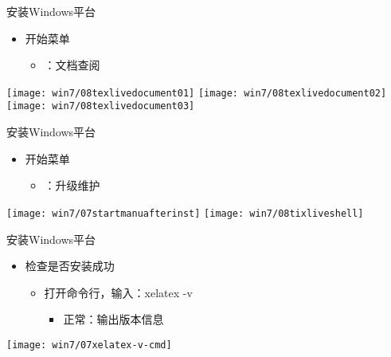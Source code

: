 \documentclass[fontset = none, t]{ctexbeamer}
\begin{document}
\begin{frame}{安装\tl}{Windows平台}
  \begin{spacing}{1.2}
    \begin{itemize}
    \item \keys{\tl}开始菜单
      \begin{itemize}
      \item {}：文档查阅
      \end{itemize}
    \end{itemize}  
    \begin{center}
      \texttt{[image: win7/08texlivedocument01]}
      \texttt{[image: win7/08texlivedocument02]}\\
      \texttt{[image: win7/08texlivedocument03]}
    \end{center}
  \end{spacing}
\end{frame}

\begin{frame}{安装\tl}{Windows平台}
  \begin{spacing}{1.5}
    \begin{itemize}
    \item \keys{\tl}开始菜单
      \begin{itemize}
      \item {}：升级维护
      \end{itemize}
    \end{itemize}  
    \begin{center}
      \texttt{[image: win7/07startmanuafterinst]}
      \texttt{[image: win7/08tixliveshell]}
    \end{center}
  \end{spacing}
\end{frame}

\begin{frame}{安装\tl}{Windows平台}
  \begin{spacing}{1.5}
    \begin{itemize}
    \item 检查\tl 是否安装成功
      \begin{itemize}
      \item 打开命令行，输入：xelatex -v
        \begin{itemize}
        \item 正常：输出\alert{版本}信息
        \end{itemize}
      \end{itemize}
    \end{itemize}
    \begin{center}
      \texttt{[image: win7/07xelatex-v-cmd]}
    \end{center}
  \end{spacing}         
\end{frame}
\end{document}
